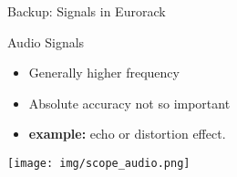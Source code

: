 \documentclass[aspectratio=169]{beamer}
\begin{document}
\begin{frame}{Backup: Signals in Eurorack}
    \begin{block}{Audio Signals}
        \begin{itemize}
            \item Generally higher frequency
            \item Absolute accuracy not so important
            \item \textbf{example:} echo or distortion effect.
        \end{itemize}
    \end{block}
    \begin{center}
        \texttt{[image: img/scope\_audio.png]}
    \end{center}
\end{frame}
\end{document}
